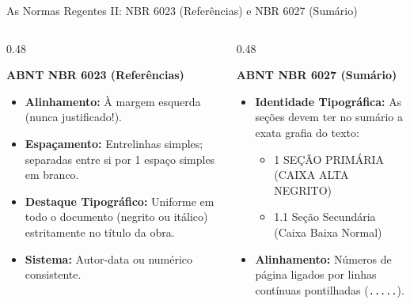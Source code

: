 \documentclass[aspectratio=169, 10pt]{beamer}
\begin{document}
\begin{frame}{As Normas Regentes II: NBR 6023 (Referências) e NBR 6027 (Sumário)}
  \begin{columns}[T]
    \begin{column}{0.48\textwidth}
      \begin{block}{\textbf{ABNT NBR 6023 (Referências)}}
        \begin{itemize}
          \item \textbf{Alinhamento:} À margem esquerda (nunca justificado!).
          \item \textbf{Espaçamento:} Entrelinhas simples; separadas entre si por 1 espaço simples em branco.
          \item \textbf{Destaque Tipográfico:} Uniforme em todo o documento (negrito ou itálico) estritamente no título da obra.
          \item \textbf{Sistema:} Autor-data ou numérico consistente.
        \end{itemize}
      \end{block}
    \end{column}

    \begin{column}{0.48\textwidth}
      \begin{block}{\textbf{ABNT NBR 6027 (Sumário)}}
        \begin{itemize}
          \item \textbf{Identidade Tipográfica:} As seções devem ter no sumário a exata grafia do texto:
            \begin{itemize}
              \item 1 SEÇÃO PRIMÁRIA (CAIXA ALTA NEGRITO)
              \item 1.1 Seção Secundária (Caixa Baixa Normal)
            \end{itemize}
          \item \textbf{Alinhamento:} Números de página ligados por linhas contínuas pontilhadas (\texttt{.....}).
        \end{itemize}
      \end{block}
    \end{column}
  \end{columns}
\end{frame}
\end{document}
